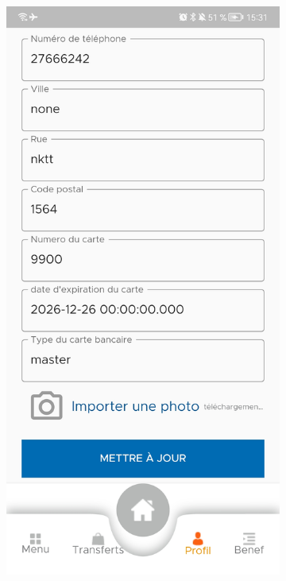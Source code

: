 \begin{itemize}[label=$\ast$]
\begin{figure}
	\hfill
	\begin{subfigure}[b]{0.3\textwidth}
		\centering
		\includegraphics[width=\textwidth]{./Template LaTeX/Images/7.jpg}

\end{subfigure}
\end{figure}
\end{itemize}
